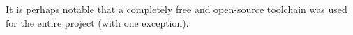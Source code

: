 \documentclass[paper.tex]{subfiles}
\begin{document}
%
%
%  
%

\tableofcontents


It is perhaps notable that a completely free and open-source toolchain was used for the entire project (with one exception).
\end{document}

